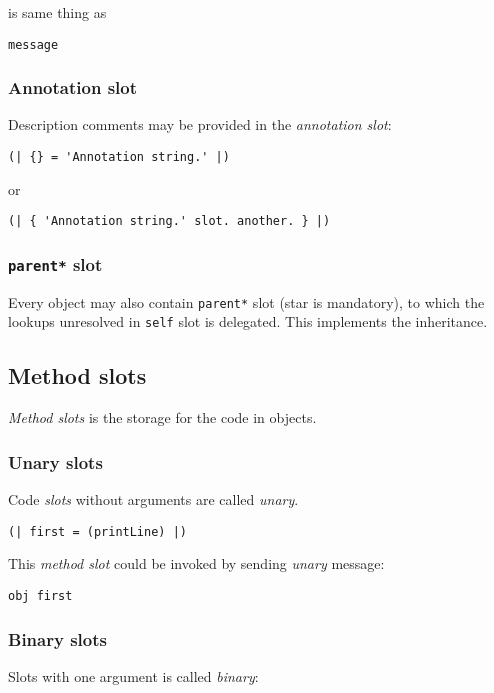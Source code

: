 \documentclass[10pt]{article}
\begin{document}
\begin{multicols*}{3}
is same thing as

\begin{lstlisting}
message
\end{lstlisting}


\subsubsection{Annotation slot}
Description comments may be provided in the \textit{annotation slot}:

\begin{lstlisting}
(| {} = 'Annotation string.' |)
\end{lstlisting}

or

\begin{lstlisting}
(| { 'Annotation string.' slot. another. } |)
\end{lstlisting}


\subsubsection{\texttt{parent*} slot}
Every object may also contain \texttt{parent*} slot (star is mandatory), to which the lookups unresolved in \texttt{self} slot is delegated. This implements the inheritance.




\subsection{Method slots}

\textit{Method slots} is the storage for the code in objects.

\subsubsection{Unary slots}
Code \textit{slots} without arguments are called \textit{unary}.

\begin{lstlisting}
(| first = (printLine) |)
\end{lstlisting}

This \textit{method slot} could be invoked by sending \textit{unary} message:

\begin{lstlisting}
obj first
\end{lstlisting}



\subsubsection{Binary slots}
Slots with one argument is called \textit{binary}:


\end{multicols*}
\end{document}
